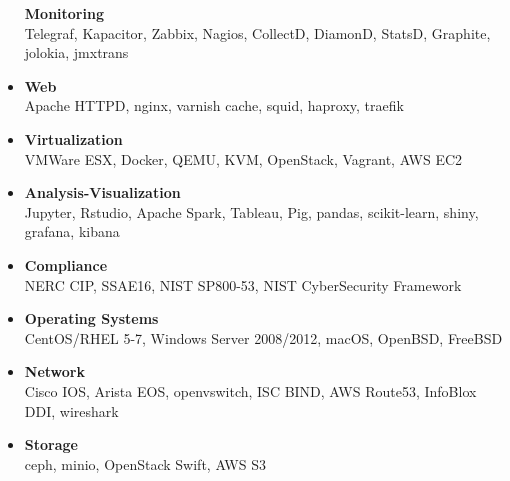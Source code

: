 \documentclass[10pt,]{article}
\begin{document}
\begin{itemize}
  \textbf{Monitoring}\\
  Telegraf, Kapacitor, Zabbix, Nagios, CollectD, DiamonD, StatsD,
  Graphite, jolokia, jmxtrans
\item
  \textbf{Web}\\
  Apache HTTPD, nginx, varnish cache, squid, haproxy, traefik
\item
  \textbf{Virtualization}\\
  VMWare ESX, Docker, QEMU, KVM, OpenStack, Vagrant, AWS EC2
\item
  \textbf{Analysis-Visualization}\\
  Jupyter, Rstudio, Apache Spark, Tableau, Pig, pandas, scikit-learn,
  shiny, grafana, kibana
\item
  \textbf{Compliance}\\
  NERC CIP, SSAE16, NIST SP800-53, NIST CyberSecurity Framework
\item
  \textbf{Operating Systems}\\
  CentOS/RHEL 5-7, Windows Server 2008/2012, macOS, OpenBSD, FreeBSD
\item
  \textbf{Network}\\
  Cisco IOS, Arista EOS, openvswitch, ISC BIND, AWS Route53, InfoBlox
  DDI, wireshark
\item
  \textbf{Storage}\\
  ceph, minio, OpenStack Swift, AWS S3
\end{itemize}
\end{document}
